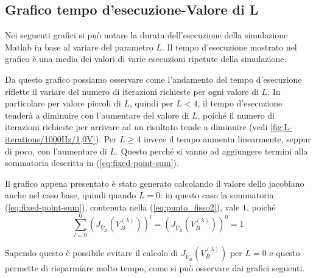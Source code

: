 		\subsection{Grafico tempo d'esecuzione-Valore di L}
			\label{subsec:tempo_esecuzione}
			Nei seguenti grafici si può notare la durata dell'esecuzione della simulazione Matlab in base al variare del parametro $L$. Il tempo d'esecuzione mostrato nel grafico è una media dei valori di varie esecuzioni ripetute della simulazione.
			
			\graficospace
			
			Da questo grafico possiamo osservare come l'andamento del tempo d'esecuzione riflette il variare del numero di iterazioni richieste per ogni valore di $L$. In particolare per valore piccoli di $L$, quindi per $L < 4$, il tempo d'esecuzione tenderà a diminuire con l'aumentare del valore di $L$, poiché il numero di iterazioni richieste per arrivare ad un risultato tende a diminuire (vedi \ref{fig:L-iterations/1000Hz/1,0V}). Per $L \ge 4$ invece il tempo aumenta linearmente, seppur di poco, con l'aumentare di $L$. Questo perché si vanno ad aggiungere termini alla sommatoria descritta in (\ref{eq:fixed-point-sum}).
			
			Il grafico appena presentato è stato generato calcolando il valore dello jacobiano anche nel caso base, quindi quando $L = 0$: in questo caso la sommatoria (\ref{eq:fixed-point-sum}), contenuta nella (\ref{eq:punto_fisso2}), vale $1$, poiché
			\[
				\sum_{l=0}^{0} \left(J_{\widehat V_{B}}(V_{B}^{(\lambda)})\right)^{l} = \left(J_{\widehat V_{B}}(V_{B}^{(\lambda)})\right)^{0} = 1
			\]
			
			Sapendo questo è possibile evitare il calcolo di $J_{\widehat V_{B}}(V_{B}^{(\lambda)})$ per $L = 0$ e questo permette di risparmiare molto tempo, come si può osservare dai grafici seguenti.
			
			\graficospace
			\graficospace
			\graficospace
			\graficospace
			\graficospace
			
